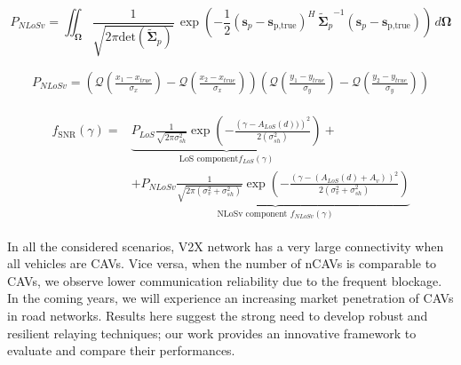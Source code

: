 \documentclass[journal]{IEEEtran}
\begin{document}
\begin{figure*}[t!] 
    \begin{equation}
        \label{eq:P_n_teorica}
        P_{NLoSv}
        = \iint_{\boldsymbol{\Omega}} \frac{1}{\sqrt{2 \pi \text{det}\left(\boldsymbol{\tilde{\Sigma}}_p\right)}} \,\exp{\left(-\frac{1}{2}\left(\mathbf{s}_p-\mathbf{s}_{\text{p,true}}\right)^H \,\left.\boldsymbol{\tilde{\Sigma}}_p\right.^{-1}  \left(\mathbf{s}_p-\mathbf{s}_{\text{{p},true}}\right) \right)}\, d\boldsymbol{\Omega} 
    \end{equation}
\end{figure*} 
\begin{figure*}
\begin{align} \label{eq:PnLoS}
     P_{{NLoSv}}=\left(\mathcal{Q}\left(\frac{x_1 - x_{true}}{\sigma_x}\right)-\mathcal{Q}\left(\frac{x_2 - x_{true}}{\sigma_x}\right) \right) \left(\mathcal{Q}\left(\frac{y_1 - y_{true}}{\sigma_y} \right)-\mathcal{Q}\left(\frac{y_2 - y_{true}}{\sigma_y}\right) \right)
\end{align}
\end{figure*}
\begin{figure*}
\begin{align} 
\begin{split}
\label{eq:path_los_dist}
    f_{\mathrm{{SNR}}}({\gamma}) = &\underbrace{ P_{LoS} \frac{1}{\sqrt{2 \pi \sigma^2_{sh}}} \exp{\left(-\frac{\left(\gamma-A_{LoS}(d))\right)^2}{2 (\sigma_{sh}^2)}\right)}}_{\text{LoS component} f_{{LoS}}({\gamma})}  + \\ 
    &+\underbrace{P_{{NLoSv}} \frac{1}{\sqrt{2 \pi (\sigma_{v}^2+\sigma_{sh}^2)}} \exp{\left(-\frac{\left(\gamma - (A_{LoS}(d)+A_{v})\right)^2}{2 (\sigma_{v}^2+\sigma_{sh}^2)}\right)}}_{\text{NLoSv component } f_{{NLoSv}}({\gamma})} 
    \end{split}
\end{align}
\end{figure*}

In all the considered scenarios, V2X network has a very large connectivity when all vehicles are CAVs. Vice versa, when the number of nCAVs is comparable to CAVs, we observe lower communication reliability due to the frequent blockage. In the coming years, we will experience an increasing market penetration of CAVs in road networks. Results here suggest the strong need to develop robust and resilient relaying techniques; our work provides an innovative framework to evaluate and compare their performances.
\end{document}
